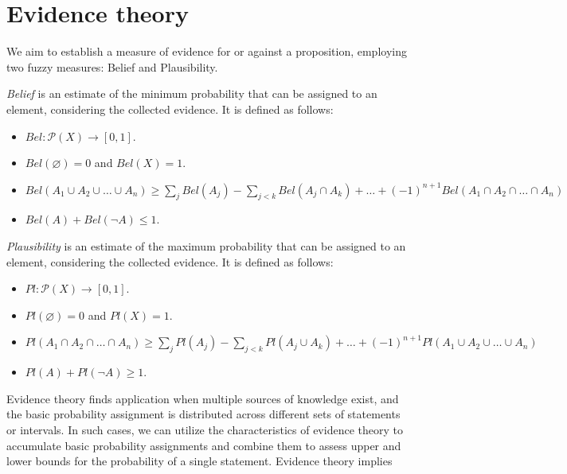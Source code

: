 \section{Evidence theory}

We aim to establish a measure of evidence for or against a proposition, employing two fuzzy measures: Belief and Plausibility.
\begin{definition}
    \emph{Belief} is an estimate of the minimum probability that can be assigned to an element, considering the collected evidence. It is defined as follows:
    \begin{itemize}
        \item $Bel:\mathcal{P} (X) \rightarrow [0,1]$.
        \item $Bel(\varnothing)=0$ and $Bel(X)=1$.
        \item $Bel(A_1 \cup A_2 \cup \dots \cup A_n) \geq \sum_{j}Bel(A_j)-\sum_{j<k}Bel(A_j \cap A_k)+\dots+(-1)^{n+1}Bel(A_1 \cap A_2 \cap \dots \cap A_n)$
        \item $Bel(A)+Bel(\lnot A) \leq 1$.
    \end{itemize}

    \emph{Plausibility} is an estimate of the maximum probability that can be assigned to an element, considering the collected evidence. It is defined as follows:
    \begin{itemize}
        \item $Pl:\mathcal{P} (X) \rightarrow [0,1]$.
        \item $Pl(\varnothing)=0$ and $Pl(X)=1$.
        \item $Pl(A_1 \cap A_2 \cap \dots \cap A_n) \geq \sum_{j}Pl(A_j)-\sum_{j<k}Pl(A_j \cup A_k)+\dots+(-1)^{n+1}Pl(A_1 \cup A_2 \cup \dots \cup A_n)$
        \item $Pl(A)+Pl(\lnot A) \geq 1$.
    \end{itemize}
\end{definition}
Evidence theory finds application when multiple sources of knowledge exist, and the basic probability assignment is distributed across different sets of statements or intervals. 
In such cases, we can utilize the characteristics of evidence theory to accumulate basic probability assignments and combine them to assess upper and lower bounds for the probability of a single statement. 
Evidence theory implies
